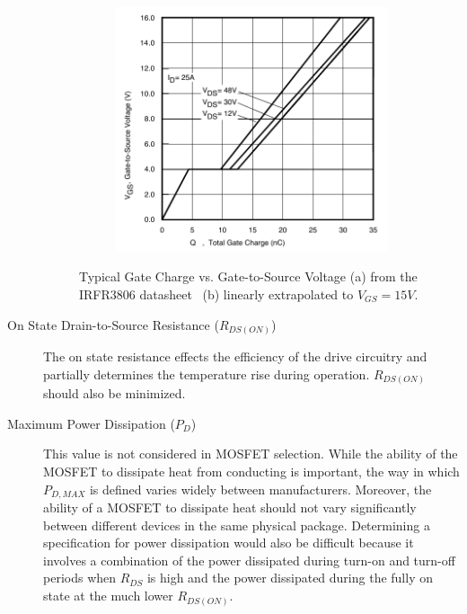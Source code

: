 \documentclass{article}
\begin{document}
\begin{description}
\begin{figure}[h]
\begin{subfigure}{0.4\textwidth}
		\caption{}
	\end{subfigure}
	\begin{subfigure}{0.4\textwidth}
		\includegraphics[width=\textwidth]{qg2}
		\caption{}
	\end{subfigure}
	\caption{Typical Gate Charge vs. Gate-to-Source Voltage (a) from the IRFR3806 datasheet \protect\footnotemark~(b) linearly extrapolated to $V_{GS}=15V$.}
	\label{fig:qg} 
\end{figure}

\item[On State Drain-to-Source Resistance ($R_{DS(ON)}$)] The on state resistance effects the efficiency of the drive circuitry and partially determines the temperature rise during operation. $R_{DS(ON)}$ should also be minimized.

 \item[Maximum Power Dissipation ($P_D$)] This value is not considered in MOSFET selection. While the ability of the MOSFET to dissipate heat from conducting is important, the way in which $P_{D,MAX}$ is defined varies widely between manufacturers. Moreover, the ability of a MOSFET to dissipate heat should not vary significantly between different devices in the same physical package. Determining a specification for power dissipation would also be difficult because it involves a combination of the power dissipated during turn-on and turn-off periods when $R_{DS}$ is high and the power dissipated during the fully on state at the much lower $R_{DS(ON)}$.
\end{description}
\end{document}
